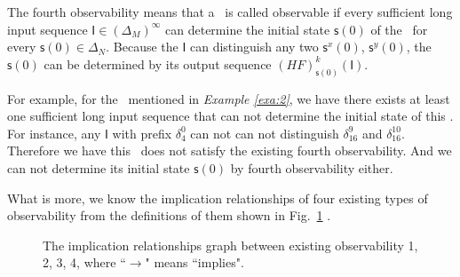 The fourth observability means that a \BCN\ is called observable if every sufficient long input sequence $\mathsf{I}\in(\Delta_M)^{\infty}$ can determine the initial state $\mathsf{s}(0)$ of the \BCN\ for every $\mathsf{s}(0)\in\Delta_N$. Because the $\mathsf{I}$ can distinguish any two $\mathsf{s}^{x}(0)$, $\mathsf{s}^{y}(0)$, the $\mathsf{s}(0)$ can be determined by its output sequence $(HF)^k_{\mathsf{s}(0)}(\mathsf{I})$.
\begin{example}
For example, for the \BCN\ mentioned in {\em Example \ref{exa:2}}, we have there exists at least one sufficient long input sequence that can not determine the initial state of this \BCN. For instance, any $\mathsf{I}$ with prefix $\delta_{4}^0$ can not can not distinguish $\delta_{16}^9$ and $\delta_{16}^{10}$. 
Therefore we have this \BCN\ does not satisfy the existing fourth observability. And we can not determine its initial state $\mathsf{s}(0)$ by fourth observability either. 
\label{exa:7}
\end{example}  

What is more, we know the implication relationships of four existing types of observability from the definitions of them shown in Fig.~\ref{fig:9} \cite{Zhang2016Observability}. 

 \begin{figure}[thpb]
      \centering
      
      \caption{The implication relationships graph between existing observability 1, 2, 3, 4, where ``$\rightarrow$" means ``implies".}
      \label{fig:9}
   \end{figure}

